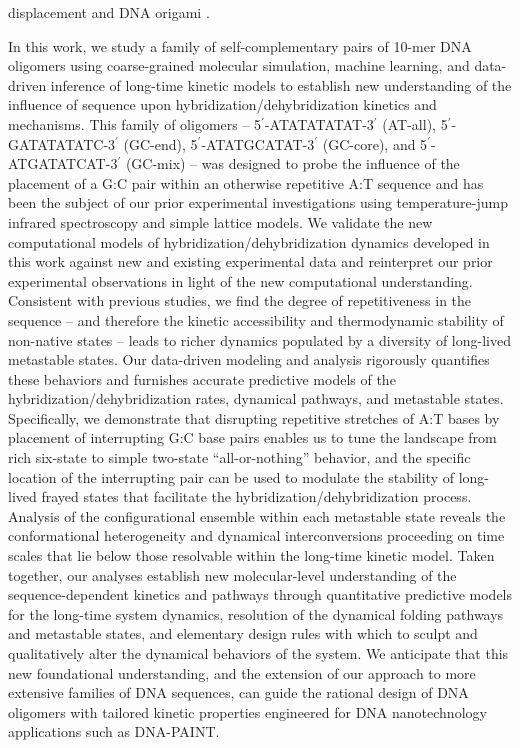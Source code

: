 \documentclass[journal=jpcbfk,manuscript=article]{achemso}
\begin{document}
displacement \citep{Srinivas2013OnDisplacement, Haley2020DesignDisplacement} and DNA origami \citep{Snodin2019Coarse-grainedOrigami, Doye2020TheOrigami}.

In this work, we study a family of self-complementary pairs of 10-mer DNA oligomers using coarse-grained molecular simulation, machine learning, and data-driven inference of long-time kinetic models to establish new understanding of the influence of sequence upon hybridization/dehybridization kinetics and mechanisms. This family of oligomers -- 5$^\prime$-ATATATATAT-3$^\prime$ (AT-all), 5$^\prime$-GATATATATC-3$^\prime$ (GC-end), 5$^\prime$-ATATGCATAT-3$^\prime$ (GC-core), and 5$^\prime$-ATGATATCAT-3$^\prime$ (GC-mix) -- was designed to probe the influence of the placement of a G:C pair within an otherwise repetitive A:T sequence and has been the subject of our prior experimental investigations using temperature-jump infrared spectroscopy and simple lattice models. \citep{Sanstead2016} We validate the new computational models of hybridization/dehybridization dynamics developed in this work against new and existing experimental data and reinterpret our prior experimental observations in light of the new computational understanding. Consistent with previous studies, \citep{Hinckley2014Coarse-grainedEffects,Romano2013DNADependence,Araque2016LatticeCooperativity} we find the degree of repetitiveness in the sequence -- and therefore the kinetic accessibility and thermodynamic stability of non-native states -- leads to richer dynamics populated by a diversity of long-lived metastable states. Our data-driven modeling and analysis rigorously quantifies these behaviors and furnishes accurate predictive models of the hybridization/dehybridization rates, dynamical pathways, and metastable states. Specifically, we demonstrate that disrupting repetitive stretches of A:T bases by placement of interrupting G:C base pairs enables us to tune the landscape from rich six-state to simple two-state ``all-or-nothing'' behavior, and the specific location of the interrupting pair can be used to modulate the stability of long-lived frayed states that facilitate the hybridization/dehybridization process. Analysis of the configurational ensemble within each metastable state reveals the conformational heterogeneity and dynamical interconversions proceeding on time scales that lie below those resolvable within the long-time kinetic model. Taken together, our analyses establish new molecular-level understanding of the sequence-dependent kinetics and pathways through quantitative predictive models for the long-time system dynamics, resolution of the dynamical folding pathways and metastable states, and elementary design rules with which to sculpt and qualitatively alter the dynamical behaviors of the system. We anticipate that this new foundational understanding, and the extension of our approach to more extensive families of DNA sequences, can guide the rational design of DNA oligomers with tailored kinetic properties engineered for DNA nanotechnology applications such as DNA-PAINT. \citep{Shah2019, Strauss2020UpDNA-PAINT}
\end{document}
